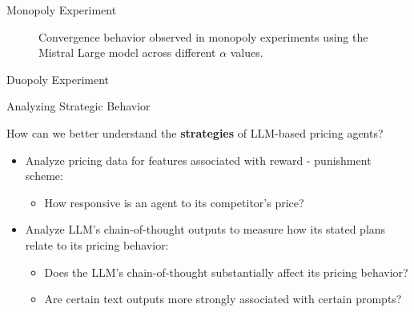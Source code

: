 \documentclass[10pt, aspectratio=169]{beamer}
\begin{document}
\begin{frame}{Monopoly Experiment}
\begin{figure}[htpb!]
    \centering
    
    \caption{Convergence behavior observed in monopoly experiments using the Mistral Large model across different $\alpha$ values.}
    \label{fig:monopoly_convergence}
\end{figure}
\end{frame}

\begin{frame}{Duopoly Experiment}
\centering
\begin{minipage}[b]{0.48\linewidth}
    \centering
    
    
\end{minipage}
\hfill
\begin{minipage}[b]{0.48\linewidth}
    \centering
    
    
\end{minipage}
\end{frame}

\begin{frame}{Analyzing Strategic Behavior}
\begin{center}
\begin{tcolorbox}[colback=gray!10, colframe=black, width=0.9\textwidth]
How can we better understand the \textbf{strategies} of LLM-based pricing agents? 
\end{tcolorbox}


\begin{itemize}
    \item Analyze pricing data for features associated with reward - punishment scheme:
    \begin{itemize}
        \item How responsive is an agent to its competitor's price?
    \end{itemize}
    \item Analyze LLM's chain-of-thought outputs to measure how its stated plans relate to its pricing behavior:
    \begin{itemize}
        \item Does the LLM's chain-of-thought substantially affect its pricing behavior?
        \item Are certain text outputs more strongly associated with certain prompts?
    \end{itemize}
\end{itemize}

\end{center}
\end{frame}
\end{document}

